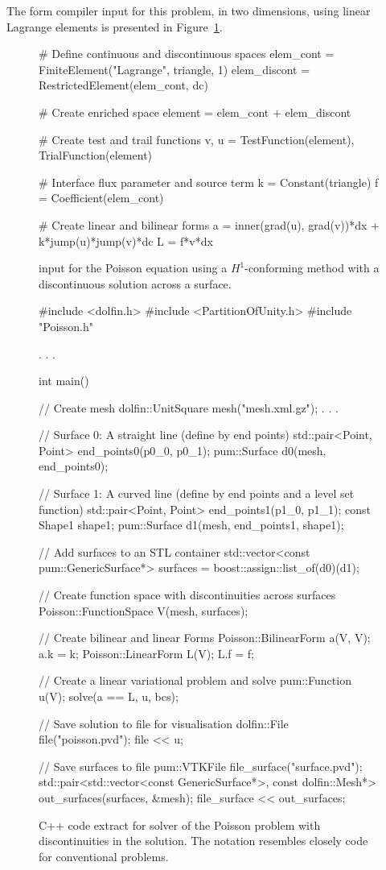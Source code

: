 The form compiler input for this problem, in two dimensions, using linear
Lagrange elements is presented in Figure~\ref{code:nikbakht:Poisson}.
%
\begin{figure}
\bwfig
\begin{python}
# Define continuous and discontinuous spaces
elem_cont    = FiniteElement("Lagrange", triangle, 1)
elem_discont = RestrictedElement(elem_cont, dc)

# Create enriched space
element = elem_cont + elem_discont

# Create test and trail functions
v, u = TestFunction(element), TrialFunction(element)

# Interface flux parameter and source term
k = Constant(triangle)
f = Coefficient(elem_cont)

# Create linear and bilinear forms
a = inner(grad(u), grad(v))*dx + k*jump(u)*jump(v)*dc
L = f*v*dx
\end{python}
\caption{{\ufl} input for the Poisson equation using a $H^{1}$-conforming
method with a discontinuous solution across a surface.}
\label{code:nikbakht:Poisson}
\end{figure}
%
\begin{figure}
\bwfig
\begin{c++}
#include <dolfin.h>
#include <PartitionOfUnity.h>
#include "Poisson.h"

  . . .

int main()
{
  // Create mesh
  dolfin::UnitSquare mesh("mesh.xml.gz");
  . . .

  // Surface 0: A straight line (define by end points)
  std::pair<Point, Point> end_points0(p0_0, p0_1);
  pum::Surface d0(mesh, end_points0);

  // Surface 1: A curved line (define by end points and a level set function)
  std::pair<Point, Point> end_points1(p1_0, p1_1);
  const Shape1 shape1;
  pum::Surface d1(mesh, end_points1, shape1);

  // Add surfaces to an STL container
  std::vector<const pum::GenericSurface*>
       surfaces = boost::assign::list_of(d0)(d1);

  // Create function space with discontinuities across surfaces
  Poisson::FunctionSpace V(mesh, surfaces);

  // Create bilinear and linear Forms
  Poisson::BilinearForm a(V, V);
  a.k = k;
  Poisson::LinearForm L(V);
  L.f = f;

  // Create a linear variational problem and solve
  pum::Function u(V);
  solve(a == L, u, bcs);

  // Save solution to file for visualisation
  dolfin::File file("poisson.pvd");
  file  << u;

  // Save surfaces to file
  pum::VTKFile file_surface("surface.pvd");
  std::pair<std::vector<const GenericSurface*>,
            const dolfin::Mesh*> out_surfaces(surfaces, &mesh);
  file_surface << out_surfaces;
}
\end{c++}
\caption{C++ code extract for solver of the Poisson problem with
discontinuities in the solution. The notation resembles closely \dolfin{}
code for conventional problems.}
\label{fig:nikbakht:poisson_c++}
\end{figure}
